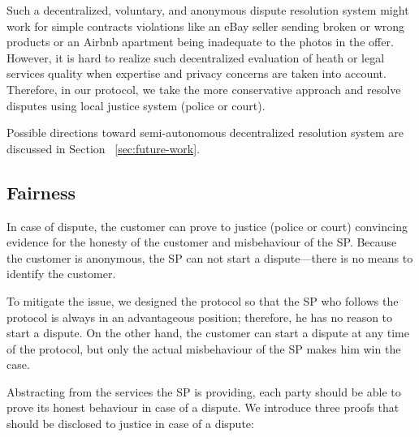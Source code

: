 \documentclass{ieeeaccess}
\begin{document}
Such a decentralized, voluntary, and anonymous dispute resolution system might work for simple contracts violations like an eBay seller sending broken or wrong products or an Airbnb apartment being inadequate to the photos in the offer. However, it is hard to realize such decentralized evaluation of heath or legal services quality when expertise and privacy concerns are taken into account. Therefore, in our protocol, we take the more conservative approach and resolve disputes using local
justice system (police or court).

Possible directions toward semi-autonomous decentralized resolution
system are discussed in Section ~\ref{sec:future-work}.

\subsection{Fairness}\label{proof-of-justice}

In case of dispute, the customer can prove to justice (police or court) convincing evidence for the honesty of the customer and misbehaviour of the SP. 
Because the customer is anonymous, the SP can not start a dispute---there is no means to identify the customer.

To mitigate the issue, we designed the protocol so that the SP who follows the protocol is always in an advantageous position; therefore, he has no reason to start a dispute. On the other hand, the customer can start a dispute at any time of the protocol, but only the actual misbehaviour of the SP makes him win the case.


Abstracting from the services the SP is providing, each party should be able to prove its honest behaviour in case of a dispute. We introduce three proofs that should be disclosed to justice in case of a dispute:
\end{document}
